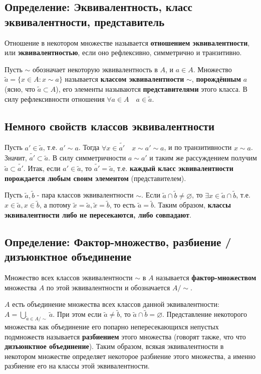 \documentclass{article}
\begin{document}
\subsection{Определение: Эквивалентность, класс эквивалентности, представитель}
Отношение в некотором множестве называется \textbf{отношением эквивалентности}, или \textbf{эквивалентностью}, если оно рефлексивно, симметрично и транзитивно.

Пусть $\sim$ обозначает некоторую эквивалентность в $A$, и $a \in A$. Множество $\tilde{a} = \{x \in A : x \sim a\}$ называется \textbf{классом эквивалентности} $\sim$, \textbf{порождённым} $a$ (ясно, что $\tilde{a} \subset A$), его элементы называются \textbf{представителями} этого класса. В силу рефлексивности отношения $\forall a \in A \quad a \in \tilde{a}$.

\subsection{Немного свойств классов эквивалентности}

Пусть $a' \in \tilde{a}$, т.е. $a' \sim a$. Тогда $\forall x \in \tilde{a'} \quad x \sim a' \sim a$, и по транзитивности $x \sim a$. Значит, $\tilde{a'} \subset \tilde{a}$. В силу симметричности $a \sim a'$ и таким же рассуждением получим $\tilde{a} \subset \tilde{a'}$. Итак, если $a' \in \tilde{a}$, то $\tilde{a'} = \tilde{a}$, т.е. \textbf{каждый класс эквивалентности порождается любым своим элементом} (представителем).

Пусть $\tilde{a}, \tilde{b}$ - пара классов эквивалентности $\sim$. Если $\tilde{a} \cap \tilde{b} \neq \varnothing$, то $\exists x \in \tilde{a} \cap \tilde{b}$, т.е. $x \in \tilde{a}, x \in \tilde{b}$, а потому $\tilde{x} = \tilde{a}, \tilde{x} = \tilde{b}$, то есть $\tilde{a} = \tilde{b}$. Таким образом, \textbf{классы эквивалентности либо не пересекаются, либо совпадают}.

\subsection{Определение: Фактор-множество, разбиение / дизъюнктное объединение}

Множество всех классов эквивалентности $\sim$ в $A$ называется \textbf{фактор-множеством} множества $A$ по этой эквивалентности и обозначается $A/\sim$.

$A$ есть объединение множества всех классов данной эквивалентности: $A = \underset{\tilde{a} \in A/\sim}{\bigcup} \tilde{a}$. При этом если $\tilde{a} \neq \tilde{b}$, то $\tilde{a} \cap \tilde{b} = \varnothing$. Представление некоторого множества как объединение его попарно непересекающихся непустых подмножеств называется \textbf{разбиением} этого множества (говорят также, что что \textbf{дизъюнктное объединение}). Таким образом, всякая эквивалентности в некотором множестве определяет некоторое разбиение этого множества, а именно разбиение его на классы этой эквивалентности.
\end{document}
